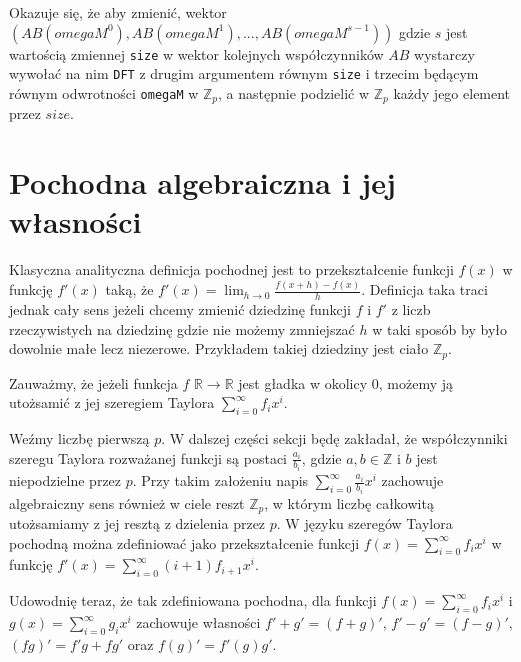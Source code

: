 \documentclass{article}
\begin{document}
Okazuje się, że aby zmienić, wektor $(AB(omegaM^0),AB(omegaM^1),...,AB(omegaM^{s-1}))$ gdzie $s$ jest wartością zmiennej \texttt{size}
w wektor kolejnych współczynników $AB$ wystarczy wywołać na nim \texttt{DFT} z drugim argumentem równym \texttt{size} i trzecim 
będącym równym odwrotności \texttt{omegaM} w $\mathbb{Z}_p$, a następnie podzielić w $\mathbb{Z}_p$ każdy jego element przez $size$. 























\section{Pochodna algebraiczna i jej własności}
Klasyczna analityczna definicja pochodnej jest to przekształcenie funkcji $f(x)$ w funkcję $f'(x)$ taką, że
$f'(x)=\lim_{h \to 0}\frac{f(x+h)-f(x)}{h}$. Definicja taka traci jednak cały sens jeżeli chcemy zmienić dziedzinę
funkcji $f$ i $f'$ z liczb rzeczywistych na dziedzinę gdzie nie możemy zmniejszać $h$ w taki sposób by było 
dowolnie małe lecz niezerowe. Przykładem takiej dziedziny jest ciało $\mathbb{Z}_p$. 

Zauważmy, że jeżeli funkcja $f$ $\mathbb{R}\to \mathbb{R}$ jest gładka w okolicy $0$, możemy ją utożsamić z jej szeregiem Taylora $\sum_{i=0}^{\infty}f_ix^i$. 

Weźmy liczbę pierwszą $p$. W dalszej części sekcji będę zakładał, że współczynniki szeregu Taylora 
rozważanej funkcji są postaci 
$\frac{a_i}{b_i}$, gdzie $a,b \in \mathbb{Z}$ i  $b$ jest niepodzielne przez $p$. Przy takim założeniu napis  
$\sum_{i=0}^{\infty}\frac{a_i}{b_i}x^i$ zachowuje algebraiczny sens również w ciele reszt $\mathbb{Z}_p$, w którym 
liczbę całkowitą utożsamiamy z jej resztą z dzielenia przez $p$. W języku szeregów Taylora pochodną można 
zdefiniować jako przekształcenie funkcji $f(x)=\sum_{i=0}^\infty f_ix^i$ w funkcję 
$f '(x)=\sum_{i=0}^{\infty}(i+1)f_{i+1}x^i$. 

Udowodnię teraz, że tak zdefiniowana pochodna, dla funkcji $f(x)=\sum_{i=0}^{\infty}f_ix^i$ i
$g(x)=\sum_{i=0}^{\infty}g_ix^i$ zachowuje własności $f'+g'=(f+g)'$, $f'-g'=(f-g)'$, $(fg)'=f'g+fg'$ oraz 
$f(g)'=f'(g)g'$.
\end{document}
